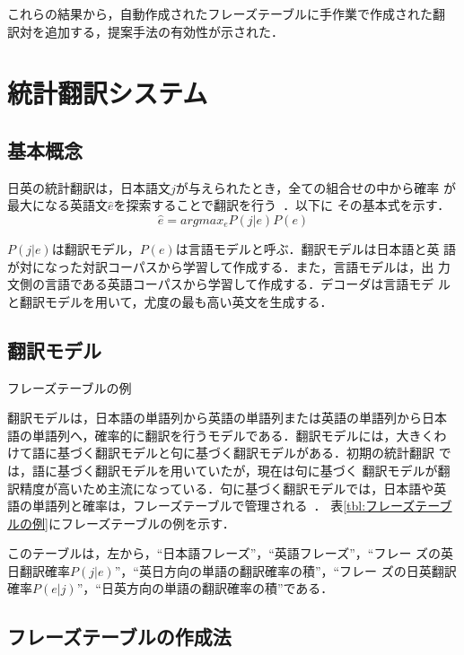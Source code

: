 \documentclass[japanese]{jnlp_1.4}
\begin{document}
これらの結果から，自動作成されたフレーズテーブルに手作業で作成された翻
訳対を追加する，提案手法の有効性が示された．

\section{統計翻訳システム}

\subsection{基本概念}

日英の統計翻訳は，日本語文$j$が与えられたとき，全ての組合せの中から確率
が最大になる英語文$\hat{e}$を探索することで翻訳を行う~\cite{IBM}．以下に
その基本式を示す．
\[
\hat{e}=argmax_{e}P(j|e)P(e)
\]

$P(j|e)$は翻訳モデル，$P(e)$は言語モデルと呼ぶ．翻訳モデルは日本語と英
語が対になった対訳コーパスから学習して作成する．また，言語モデルは，出
力文側の言語である英語コーパスから学習して作成する．デコーダは言語モデ
ルと翻訳モデルを用いて，尤度の最も高い英文を生成する．


\subsection{翻訳モデル}

\begin{table}[b]
\caption{フレーズテーブルの例}
\label{tbl:フレーズテーブルの例}

\end{table}

翻訳モデルは，日本語の単語列から英語の単語列または英語の単語列から日本
語の単語列へ，確率的に翻訳を行うモデルである．翻訳モデルには，大きくわ
けて語に基づく翻訳モデルと句に基づく翻訳モデルがある．初期の統計翻訳
では，語に基づく翻訳モデルを用いていたが，現在は句に基づく
翻訳モデルが翻訳精度が高いため主流になっている．句に基づく翻訳モデルでは，日本語や英
語の単語列と確率は，フレーズテーブルで管理される~\cite{moses}．
表\ref{tbl:フレーズテーブルの例}にフレーズテーブルの例を示す．



このテーブルは，左から，``日本語フレーズ''，``英語フレーズ''，``フレー
ズの英日翻訳確率$P(j|e)$''，``英日方向の単語の翻訳確率の積''，``フレー
ズの日英翻訳確率$P(e|j)$''，``日英方向の単語の翻訳確率の積''である．


\subsection{フレーズテーブルの作成法}
\end{document}

